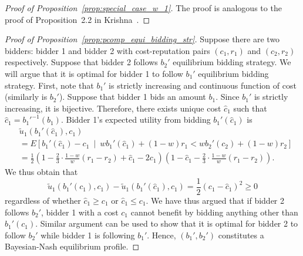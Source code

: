 \begin{proof}[Proof of Proposition~\ref{prop:special_case_w_1}]
The proof is analogous to the proof of Proposition~2.2 in Krishna~\cite{Krishna10}.
\end{proof}

\begin{proof}[Proof of Proposition~\ref{prop:pcomp_equi_bidding_str}]
Suppose there are two bidders: bidder 1 and bidder 2 with cost-reputation pairs $(c_1,r_1)$ and $(c_2,r_2)$ respectively. Suppose that bidder 2 follows $b_2'$ equilibrium bidding strategy. We will argue that it is optimal for bidder 1 to follow $b_1'$ equilibrium bidding strategy. First, note that $b_1'$ is strictly increasing and continuous function of cost (similarly is $b_2'$). Suppose that bidder 1 bids an amount $b_1$. Since $b_1'$ is strictly increasing, it is bijective. Therefore, there exists unique cost $\hat{c}_1$ such that $\hat{c}_1 = {b_1'}^{-1}(b_1)$. Bidder 1's expected utility from bidding $b_1'(\hat{c}_1)$ is
\begin{align*}
	&\tilde{u}_1(b_1'(\hat{c}_1), c_1) \\
	&= E \left[ b_1'(\hat{c}_1) - c_1 \:\middle\vert\: wb_1'(\hat{c}_1) + (1-w)r_1 < wb_2'(c_2) + (1-w)r_2 \right] \\
	&= \frac{1}{2} \left( 1 - \frac{2}{3}\cdot\frac{1-w}{w}(r_1-r_2) + \hat{c}_1 - 2c_1 \right) \left( 1 - \hat{c}_1 - \frac{2}{3}\cdot\frac{1-w}{w}(r_1-r_2) \right).
\end{align*}
We thus obtain that
\begin{equation*}
	\tilde{u}_1(b_1'(c_1), c_1) - \tilde{u}_1(b_1'(\hat{c}_1), c_1) = \frac{1}{2}(c_1-\hat{c}_1)^2 \ge 0
\end{equation*}
regardless of whether $\hat{c}_1\ge c_1$ or $\hat{c}_1 \le c_1$. We have thus argued that if bidder 2 follows $b_2'$, bidder 1 with a cost $c_1$ cannot benefit by bidding anything other than $b_1'(c_1)$. Similar argument can be used to show that it is optimal for bidder 2 to follow $b_2'$ while bidder 1 is following $b_1'$. Hence, $(b_1',b_2')$ constitutes a Bayesian-Nash equilibrium profile.
\end{proof}

